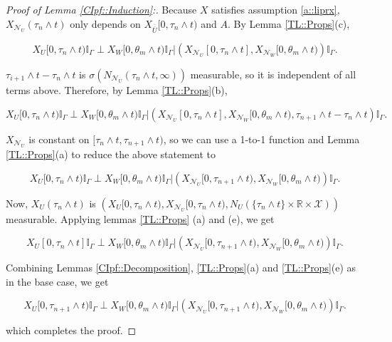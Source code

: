 \documentclass[12pt]{article}
\newcommand{\mb}{\mathbb}
\newcommand{\mc}{\mathcal}
\newcommand{\ov}{\overline}
\newcommand{\sta}{\mc{X}}							%
\newcommand{\neigh}[1]{\mc{N}_{#1}}					%
\newcommand{\cl}[1]{\ov{#1}}						%
\newcommand{\Xf}{X}									%
\newcommand{\poiss}{N}								%
\newcommand{\poissv}[1]{_{#1}}						%
\newcommand{\vind}[1]{_{#1}}						%
\newcommand{\tme}[1]{(#1)}							%
\newcommand{\tmi}[1]{#1}							%
\newcommand{\seto}{U}								%
\newcommand{\sett}{W}								%
\newcommand{\rtt}{\theta}							%
\newcommand{\apath}{\Gamma}						%
\newcommand{\rv}{A}								%
\newcommand{\indo}{n}							%
\newcommand{\indt}{m}							%
\newcommand{\rt}{\tau}								%
\renewcommand{\it}[1]{_{#1}}						%
\begin{document}
\begin{proof}[Proof of Lemma \ref{CIpf::Induction}:]
Because \(\Xf\) satisfies assumption \ref{a::liprx}, \(\Xf\vind{\neigh{\seto}}\tme{\rt\it{\indo}\wedge t}\) only depends on \(\Xf\vind{\cl{\cl{\seto}}}\tmi{[0,\rt\it{\indo}\wedge t)}\) and \(\rv\). By Lemma \ref{TL::Props}(c), 

\[\Xf\vind{\seto}\tmi{[0,\rt\it{\indo}\wedge t)}\mb{I}_{\apath}\perp \Xf\vind{\sett}\tmi{[0,\rtt\it{\indt}\wedge t)}\mb{I}_{\apath}|\left(\Xf\vind{\neigh{\seto}}\tmi{[0,\rt\it{\indo}\wedge t]},\Xf\vind{\neigh{\sett}}\tmi{[0,\rtt\it{\indt}\wedge t)}\right)\mb{I}_{\apath}.\]

\(\rt\it{i+1}\wedge t - \rt\it{\indo}\wedge t\) is \(\sigma(\poiss\poissv{\neigh{\seto}}(\rt\it{\indo}\wedge t,\infty))\) measurable, so it is independent of all terms above. Therefore, by Lemma \ref{TL::Props}(b),

\[\Xf\vind{\seto}\tmi{[0,\rt\it{\indo}\wedge t)}\mb{I}_{\apath}\perp \Xf\vind{\sett}\tmi{[0,\rtt\it{\indt}\wedge t)}\mb{I}_{\apath}|\left(\Xf\vind{\neigh{\seto}}\tmi{[0,\rt\it{\indo}\wedge t]},\Xf\vind{\neigh{\sett}}\tmi{[0,\rtt\it{\indt}\wedge t)},\rt\it{\indo+1}\wedge t - \rt\it{\indo}\wedge t\right)\mb{I}_{\apath}.\]

\(\Xf\vind{\neigh{\seto}}\) is constant on \([\rt\it{\indo}\wedge t,\rt\it{\indo+1}\wedge t)\), so we can use a 1-to-1 function and Lemma \ref{TL::Props}(a) to reduce the above statement to

\[\Xf\vind{\seto}\tmi{[0,\rt\it{\indo}\wedge t)}\mb{I}_{\apath}\perp \Xf\vind{\sett}\tmi{[0,\rtt\it{\indt}\wedge t)}\mb{I}_{\apath}|\left(\Xf\vind{\neigh{\seto}}\tmi{[0,\rt\it{\indo+1}\wedge t)},\Xf\vind{\neigh{\sett}}\tmi{[0,\rtt\it{\indt}\wedge t)}\right)\mb{I}_{\apath}.\]

Now, \(\Xf\vind{\seto}\tme{\rt\it{\indo}\wedge t}\) is \(\left(\Xf\vind{\seto}\tmi{[0,\rt\it{\indo}\wedge t)}, \Xf\vind{\neigh{\seto}}\tmi{[0,\rt\it{\indo}\wedge t)}, \poiss\poissv{\seto}(\{\rt\it{\indo}\wedge t\}\times \mb{R}\times\sta)\right)\) measurable. Applying lemmas \ref{TL::Props} (a) and (e), we get

\[\Xf\vind{\seto}\tmi{[0,\rt\it{\indo}\wedge t]}\mb{I}_{\apath}\perp \Xf\vind{\sett}\tmi{[0,\rtt\it{\indt}\wedge t)}\mb{I}_{\apath}|\left(\Xf\vind{\neigh{\seto}}\tmi{[0,\rt\it{\indo+1}\wedge t)},\Xf\vind{\neigh{\sett}}\tmi{[0,\rtt\it{\indt}\wedge t)}\right)\mb{I}_{\apath}.\]

Combining Lemmas \ref{CIpf::Decomposition}, \ref{TL::Props}(a) and \ref{TL::Props}(e) as in the base case, we get

\[\Xf\vind{\seto}\tmi{[0,\rt\it{\indo+1}\wedge t)}\mb{I}_{\apath}\perp \Xf\vind{\sett}\tmi{[0,\rtt\it{\indt}\wedge t)}\mb{I}_{\apath}|\left(\Xf\vind{\neigh{\seto}}\tmi{[0,\rt\it{\indo+1}\wedge t)},\Xf\vind{\neigh{\sett}}\tmi{[0,\rtt\it{\indt}\wedge t)}\right)\mb{I}_{\apath}.\]

which completes the proof.
\end{proof}
\end{document}
